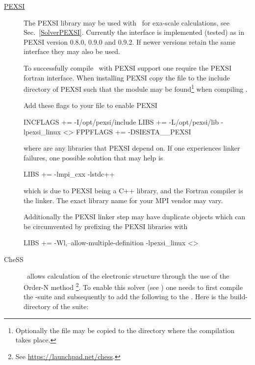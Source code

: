 \begin{description}
  \item[\href{https://math.berkeley.edu/~linlin/pexsi}{PEXSI}]%
  The PEXSI library may be used with \siesta\ for exa-scale
  calculations, see Sec.~\ref{SolverPEXSI}. Currently the interface is
  implemented (tested) as in PEXSI version 0.8.0, 0.9.0 and 0.9.2. If
  newer versions retain the same interface they may also be used.

  To successfully compile \siesta\ with PEXSI support one require the
  PEXSI fortran interface. When installing PEXSI copy the
   file to the include directory of
  PEXSI such that the module may be found\footnote{Optionally the file
      may be copied to the  directory where the compilation
      takes place.} when compiling \siesta.

  Add these flags to your  file to enable PEXSI
\begin{shellexample}
  INCFLAGS += -I/opt/pexsi/include
  LIBS += -L/opt/pexsi/lib -lpexsi_linux <>
  FPPFLAGS += -DSIESTA__PEXSI
\end{shellexample}
  where \shell{<>} are any libraries that PEXSI depend on. 
  If one experiences linker failures, one possible solution that may
  help is
\begin{shellexample}
  LIBS += -lmpi_cxx -lstdc++
\end{shellexample}
  which is due to PEXSI being a C++ library, and the Fortran compiler
  is the linker. The exact library name for your MPI vendor may
  vary. 

  Additionally the PEXSI linker step may have duplicate objects which
  can be circumvented by prefixing the PEXSI libraries with
\begin{shellexample}
  LIBS += -Wl,--allow-multiple-definition -lpexsi_linux <>
\end{shellexample}


  \item[CheSS]%
  \siesta\ allows calculation of the electronic structure through the
  use of the Order-N method \footnote{See
      \url{https://launchpad.net/chess}.}. To enable this solver (see
  ) one needs to first compile the
  -suite and subsequently to add the following to the
  . Here  is the build-directory
  of the  suite:  


\end{description}
